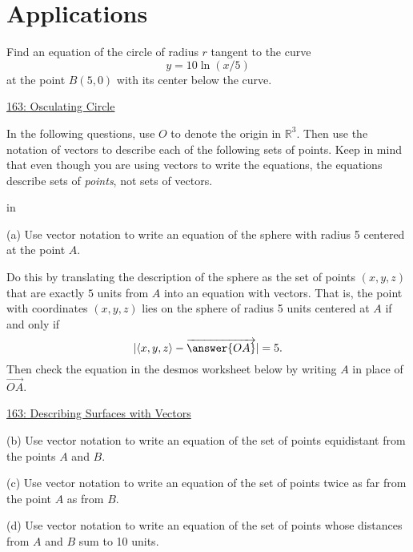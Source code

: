 \documentclass{ximera}
\newcommand{\pskip}{\vskip 0.1 in}
\begin{document}
\section{Applications}

\begin{question} \label{Q98734454331}
Find an equation of the circle of radius $r$ tangent to the curve
\[
    y=10\ln (x/5)
\]
at the point $B(5,0)$ with its center below the curve.

 
\begin{onlineOnly}
    \begin{center}
\end{center}
\end{onlineOnly}
 
\href{https://www.geogebra.org/classic/fgvvdjaf}{163: Osculating Circle}
 
\end{question}

\begin{question}  \label{Eq:32404:Vectors}
In the following questions, use $O$ to denote the origin in $\mathbb{R}^3$. Then use the notation of vectors to describe each of the following sets of points. Keep in mind that even though you are using vectors to write the equations, the equations describe sets of \emph{points}, not sets of vectors.


 
\pskip

(a) Use vector notation to write an equation of the sphere with radius 5 centered at the point $A$. 

Do this by translating the description of the sphere as the set of points $(x,y,z)$ that are exactly $5$ units from $A$ into an equation with vectors. That is, the point with coordinates $(x,y,z)$ lies on the sphere of radius 5 units centered at $A$ if and only if
\[
      | \langle x,y,z \rangle  - \overrightarrow{\answer{OA}} | = 5 .
\]
Then check the equation in the desmos worksheet below by writing $A$ in place of $\overrightarrow{OA}$.

\begin{onlineOnly}
    \begin{center}
\end{center}
\end{onlineOnly}
 
\href{https://www.desmos.com/3d/wiyxc2rwhu}{163: Describing Surfaces with Vectors}

(b) Use vector notation to write an equation of the set of points equidistant from the points $A$ and $B$.

(c) Use vector notation to write an equation of the set of points twice as far from the point $A$ as from $B$.

(d) Use vector notation to write an equation of the set of points whose distances from $A$ and $B$ sum to 10 units.


\end{question}
\end{document}
